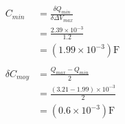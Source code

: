 \documentclass[11pt]{article}
\begin{document}
\hfill
\begin{minipage}{0.45\textwidth}
\begin{center}
\begin{equation*}
\begin{split}
       C_{min}&= \frac{\delta Q_{min}}{\delta\Delta V_{max}}\\
              &= \frac{2.39\times 10^{-3}}{1.2}\\
              &= (1.99\times 10^{-3})\mathrm F\\
              &\\
\delta C_{moy}&= \frac{Q_{max}-Q_{min}}{2}\\
              &= \frac{(3.21-1.99)\times 10^{-3}}{2}\\
              &= (0.6\times 10^{-3})\mathrm F\\
\end{split}
\end{equation*}
\end{center}
\end{minipage}
\end{document}
